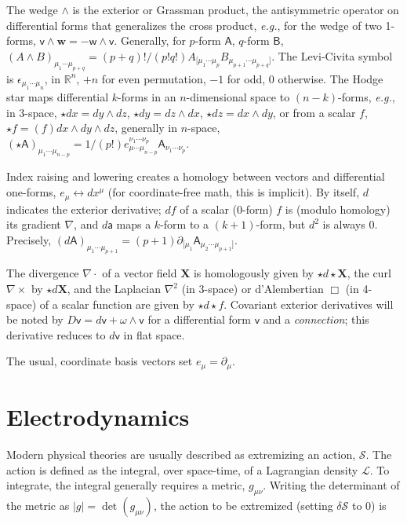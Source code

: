 The wedge $\wedge$ is the exterior or Grassman product, the antisymmetric operator on differential forms that generalizes the cross product, \textit{e.g.}, for the wedge of two 1-forms, $\textsf{v} \wedge \textbf{w} = -\textsf{w} \wedge \textsf{v}$.
Generally, for $p$-form $\textsf{A}$, $q$-form $\textsf{B}$, $(A \wedge B)_{\mu_1 \cdots \mu_{p+q}} = (p+q)!/(p!q!) A_{[\mu_1\cdots\mu_p} B_{\mu_{p+1} \cdots \mu_{p+q} ]}$. 
The Levi-Civita symbol is $\epsilon_{\mu_1 \cdots \mu_n}$, in $\mathbb{R}^n$, $+n$ for even permutation, $-1$ for odd, $0$ otherwise.
The Hodge star maps differential $k$-forms in an $n$-dimensional space to $(n-k)$-forms, \textit{e.g.}, in 3-space, $\star dx = dy \wedge dz$, $\star dy = dz \wedge dx$, $\star dz = dx \wedge dy$, or from a scalar $f$, $\star f = (f) dx \wedge dy \wedge dz$, generally in $n$-space, $(\star \textsf{A})_{\mu_1 \cdots \mu_{n-p}} = 1/(p!) e^{\nu_1 \cdots \nu_p}_{\mu \cdots \mu_{n-p}} \textsf{A}_{\nu_1 \cdots \nu_p}$.

Index raising and lowering creates a homology between vectors and differential one-forms, $e_\mu \leftrightarrow dx^\mu$ (for coordinate-free math, this is implicit).
By itself, $d$ indicates the exterior derivative; $df$ of a scalar (0-form) $f$ is (modulo homology) its gradient $\nabla$, and $d\textsf{a}$ maps a $k$-form to a $(k+1)$-form, but $d^2$ is always 0.
Precisely, $(d\textsf{A})_{\mu_1 \cdots \mu_{p+1}} = (p+1) \partial_{[\mu_1} \textsf{A}_{\mu_2 \cdots \mu_{p+1}]}$. 


The divergence $\nabla \cdot$ of a vector field $\textbf{X}$ is homologously given by $\star d \star \textbf{X}$, the curl $\nabla \times$ by $\star d \textbf{X}$, and the Laplacian $\nabla^2$ (in 3-space) or d'Alembertian $\Box$ (in 4-space) of a scalar function are given by $\star d \star f$.
Covariant exterior derivatives will be noted by $D \textsf{v} = d \textsf{v} + \omega \wedge \textsf{v}$ for a differential form $\textsf{v}$ and a \textit{connection}; this derivative reduces to $d\textsf{v}$ in flat space.

The usual, coordinate basis vectors set $e_\mu = \partial_\mu$.

\section{Electrodynamics}

Modern physical theories are usually described as extremizing an action, $\mathcal{S}$. 
The action is defined as the integral, over space-time, of a Lagrangian density $\mathcal{L}$. 
To integrate, the integral generally requires a metric, $g_{\mu\nu}$.
Writing the determinant of the metric as $|g| = \det(g_{\mu\nu})$, the action to be extremized (setting $\delta \mathcal{S}$ to 0) is

